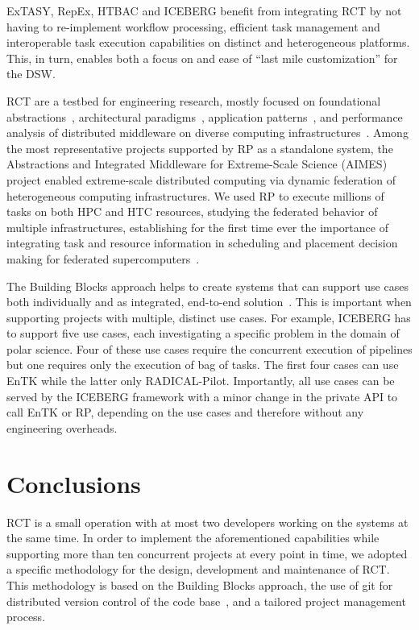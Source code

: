 \documentclass[preprint,12pt, a4paper]{elsarticle}
\begin{document}
ExTASY, RepEx, HTBAC and ICEBERG benefit from integrating RCT by not having
to re-implement workflow processing, efficient task management and
interoperable task execution capabilities on distinct and heterogeneous
platforms. This, in turn, enables both a focus on and ease of ``last mile
customization'' for the DSW\@.

RCT are a testbed for engineering research, mostly focused on foundational
abstractions~\cite{turilli2017evaluating}, architectural
paradigms~\cite{turilli2018comprehensive}, application
patterns~\cite{app-patterns}, and performance analysis of distributed
middleware on diverse computing infrastructures~\cite{performance-analysis}.
Among the most representative projects supported by RP as a standalone
system, the Abstractions and Integrated Middleware for Extreme-Scale Science
(AIMES) project enabled extreme-scale distributed computing via dynamic
federation of heterogeneous computing infrastructures. We used RP to execute
millions of tasks on both HPC and HTC resources, studying the federated
behavior of multiple infrastructures, establishing for the first time ever
the importance of integrating task and resource information in scheduling and
placement decision making for federated
supercomputers~\cite{turilli2016integrating}.

The Building Blocks approach helps to create systems that can support use
cases both individually and as integrated, end-to-end
solution~\cite{turilli2019middleware}. This is important when supporting
projects with multiple, distinct use cases. For example, ICEBERG has to
support five use cases, each investigating a specific problem in the domain
of polar science. Four of these use cases require the concurrent execution of
pipelines but one requires only the execution of bag of tasks. The first four
cases can use EnTK while the latter only RADICAL-Pilot. Importantly, all use
cases can be served by the ICEBERG framework with a minor change in the
private API to call EnTK or RP, depending on the use cases and therefore
without any engineering overheads.


\section{Conclusions}\label{sec:conclusions}

RCT is a small operation with at most two developers working on the systems
at the same time. In order to implement the aforementioned capabilities while
supporting more than ten concurrent projects at every point in time, we
adopted a specific methodology for the design, development and maintenance of
RCT\@. This methodology is based on the Building Blocks approach, the use of
git for distributed version control of the code base~\cite{github-rct}, and a
tailored project management process.
\end{document}
